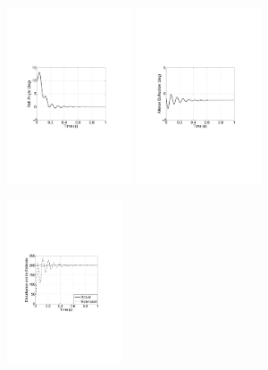 \documentclass[table,10pt,red]{beamer}	%
\begin{document}
\begin{frame}
\begin{figure}
\includegraphics[width=3.7cm]{fig6a}
\includegraphics[width=3.7cm]{fig6b}
\begin{center}
\includegraphics[width=3.4cm]{fig6c}
\end{center}
\end{figure}
\end{frame}
\end{document}
